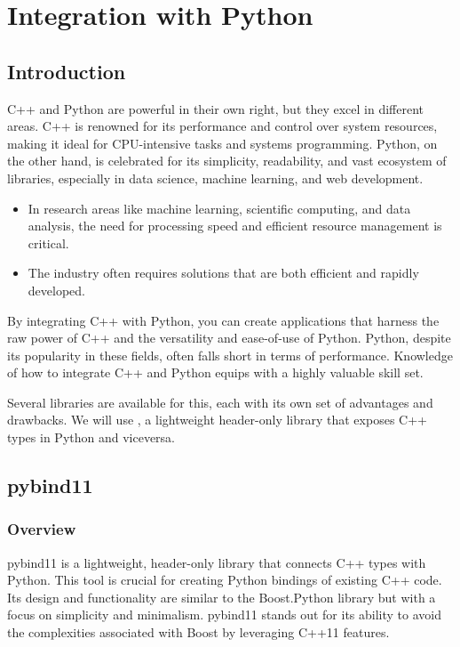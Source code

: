 
\chapter{Integration with Python}

\section{Introduction}

C++ and Python are powerful in their own right, but they excel in different areas. C++ is renowned
for its performance and control over system resources, making it ideal for CPU-intensive tasks and
systems programming. Python, on the other hand, is celebrated for its simplicity, readability, and
vast ecosystem of libraries, especially in data science, machine learning, and web development.
\begin{itemize}
    \item In research areas like machine learning, scientific computing, and data analysis, the need for
    processing speed and efficient resource management is critical.
    \item The industry often requires solutions that are both efficient and rapidly developed.
\end{itemize}
By integrating C++ with Python, you can create applications that harness the raw power of C++
and the versatility and ease-of-use of Python. Python, despite its popularity in these fields, often
falls short in terms of performance. Knowledge of how to integrate C++ and Python equips with a
highly valuable skill set.

Several libraries are available for this, each with its own set of advantages and drawbacks.
We will use , a lightweight header-only library that exposes C++ types in Python and viceversa.

\section{pybind11}

\subsection{Overview}

pybind11 is a lightweight, header-only library that connects C++ types with Python. This tool is
crucial for creating Python bindings of existing C++ code. Its design and functionality are similar to
the Boost.Python library but with a focus on simplicity and minimalism. pybind11 stands out for its
ability to avoid the complexities associated with Boost by leveraging C++11 features.

